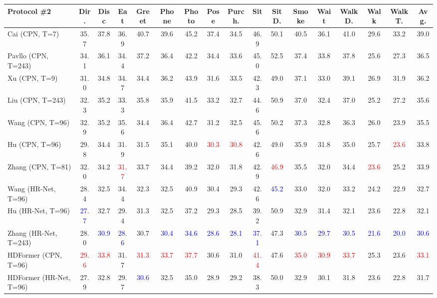 \documentclass{article}
\begin{document}
\begin{table*}
{\begin{tabular}{l|c|c|c|c|c|c|c|c|c|c|c|c|c|c|c|c}
    \hline
    \hline
    \textbf{Protocol \#2}  & Dir. & Disc & Eat & Greet & Phone & Photo & Pose & Purch. & Sit & SitD. & Smoke & Wait & WalkD. & Walk & WalkT. & Avg. \\ 
    \hline
    Cai \cite{cai2019-exploiting} (CPN, T=7)  & 35.7 & 37.8 & 36.9 & 40.7 & 39.6 & 45.2 & 37.4 & 34.5 & 46.9 & 50.1 & 40.5 & 36.1 & 41.0 & 29.6 & 33.2 & 39.0 \\ 
    Pavllo \cite{pavllo2019-3d} (CPN, T=243)  & 34.1 & 36.1 & 34.4 & 37.2 & 36.4 & 42.2 & 34.4 & 33.6 & 45.0 & 52.5 & 37.4 & 33.8 & 37.8 & 25.6 & 27.3 & 36.5 \\ 
    Xu \cite{xu2020-deep} (CPN, T=9)  & 31.0 & 34.8 & 34.7 & 34.4 & 36.2 & 43.9 & 31.6 & 33.5 & 42.3 & 49.0 & 37.1 & 33.0 & 39.1 & 26.9 & 31.9 & 36.2 \\ 
    Liu \cite{liu2020-attention}(CPN, T=243)  & 32.3 & 35.2 & 33.3 & 35.8 & 35.9 & 41.5 & 33.2 & 32.7 & 44.6 & 50.9 & 37.0 & 32.4 & 37.0 & 25.2 & 27.2 & 35.6 \\ 
    Wang \cite{wang2020-motion} (CPN, T=96)   & 32.9 & 35.2 & 35.6 & 34.4 & 36.4 & 42.7 & 31.2 & 32.5 & 45.6 & 50.2 & 37.3 & 32.8 & 36.3 & 26.0 & 23.9 & 35.5 \\ 
    Hu \cite{hu(2021)-conditional} (CPN, T=96)  & 29.8 & 34.4 & 31.9 & 31.5 & 35.1 & 40.0 & \textcolor{red}{30.3} & \textcolor{red}{30.8} & 42.6 & 49.0 & 35.9 & 31.8 & 35.0 & 25.7 & \textcolor{red}{23.6} & 33.8 \\ 
    Zhang \cite{ZhangCVPR22MixSTE} (CPN, T=81)  & 32.0 & 34.2 & \textcolor{red}{31.7} & 33.7 & 34.4 & 39.2 & 32.0 & 31.8 & 42.9 & \textcolor{red}{46.9} & 35.5 & 32.0 & 34.4 & \textcolor{red}{23.6} & 25.2 & 33.9 \\ 
    Wang \cite{wang2020-motion} (HR-Net, T=96)   & 28.4 & 32.5 & 34.4 & 32.3 & 32.5 & 40.9 & 30.4 & 29.3 & 42.6 & \textcolor{blue}{45.2} & 33.0 & 32.0 & 33.2 & 24.2 & 22.9 & 32.7 \\ 
    Hu \cite{hu(2021)-conditional} (HR-Net, T=96)  & \textcolor{blue}{27.7} & 32.7 & 29.4 & 31.3 & 32.5 & 37.2 & 29.3 & 28.5 & 39.2 & 50.9 & 32.9 & 31.4 & 32.1 & 23.6 & 22.8 & 32.1 \\ 
    Zhang \cite{ZhangCVPR22MixSTE} (HR-Net, T=243)  & 28.0 & \textcolor{blue}{30.9} & \textcolor{blue}{28.6} & 30.7 & \textcolor{blue}{30.4} & \textcolor{blue}{34.6} & \textcolor{blue}{28.6} & \textcolor{blue}{28.1} & \textcolor{blue}{37.1} & 47.3 & \textcolor{blue}{30.5} & \textcolor{blue}{29.7} & \textcolor{blue}{30.5} & \textcolor{blue}{21.6} & \textcolor{blue}{20.0} & \textcolor{blue}{30.6} \\ 
    \hline
    HDFormer (CPN, T=96)  & \textcolor{red}{29.6} & \textcolor{red}{33.8} & 31.7 & \textcolor{red}{31.3} & \textcolor{red}{33.7} & \textcolor{red}{37.7} & 30.6 & 31.0 & \textcolor{red}{41.4} & 47.6 & \textcolor{red}{35.0} & \textcolor{red}{30.9} & \textcolor{red}{33.7} & 25.3 & 23.6 & \textcolor{red}{33.1} \\ 
    HDFormer (HR-Net, T=96)  & 27.9 & 32.8 & 29.7 & \textcolor{blue}{30.6} & 32.5 & 35.0 & 28.9 & 29.2 & 38.3 & 50.0 & 32.9 & 30.1 & 31.8 & 23.6 & 22.8 & 31.7 \\ 


\end{tabular}}
\end{table*}
\end{document}
